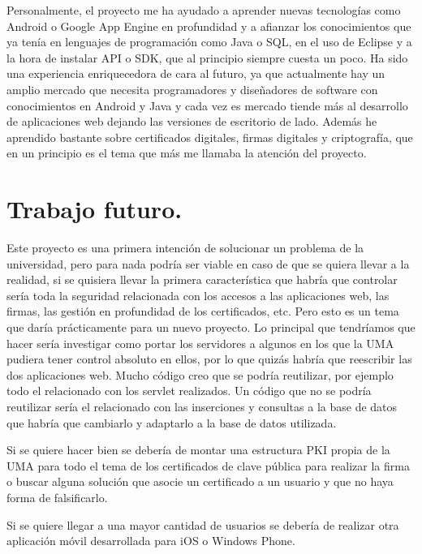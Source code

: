 Personalmente, el proyecto me ha ayudado a aprender nuevas tecnologías como Android o Google App Engine en profundidad y a afianzar los conocimientos que ya tenía en lenguajes de programación como Java o SQL, en el uso de Eclipse y a la hora de instalar API o SDK, que al principio siempre cuesta un poco. Ha sido una experiencia enriquecedora de cara al futuro, ya que actualmente hay un amplio mercado que necesita programadores y diseñadores de software con conocimientos en Android y Java y cada vez es mercado tiende más al desarrollo de aplicaciones web dejando las versiones de escritorio de lado. Además he aprendido bastante sobre certificados digitales, firmas digitales y criptografía, que en un principio es el tema que más me llamaba la atención del proyecto.

\section{Trabajo futuro.}

Este proyecto es una primera intención de solucionar un problema de la universidad, pero para nada podría ser viable en caso de que se quiera llevar a la realidad, si se quisiera llevar la primera característica que habría que controlar sería toda la seguridad relacionada con los accesos a las aplicaciones web, las firmas, las gestión en profundidad de los certificados, etc. Pero esto es un tema que daría prácticamente para un nuevo proyecto. Lo principal que tendríamos que hacer sería investigar como portar los servidores a algunos en los que la UMA pudiera tener control absoluto en ellos, por lo que quizás habría que reescribir las dos aplicaciones web. Mucho código creo que se podría reutilizar, por ejemplo todo el relacionado con los servlet realizados. Un código que no se podría reutilizar sería el relacionado con las inserciones y consultas a la base de datos que habría que cambiarlo y adaptarlo a la base de datos utilizada.

Si se quiere hacer bien se debería de montar una estructura PKI propia de la UMA para todo el tema de los certificados de clave pública para realizar la firma o buscar alguna solución que asocie un certificado a un usuario y que no haya forma de falsificarlo.

Si se quiere llegar a una mayor cantidad de usuarios se debería de realizar otra aplicación móvil desarrollada para iOS o Windows Phone.

